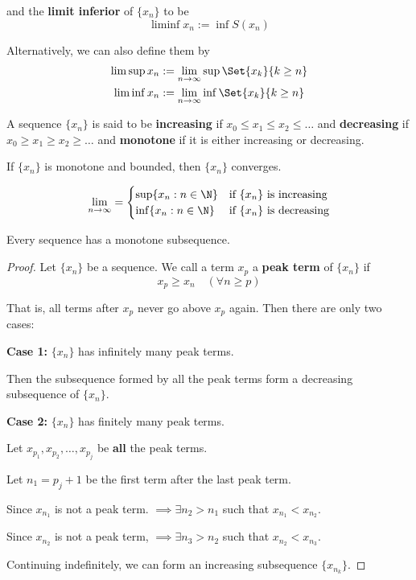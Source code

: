 and the \textbf{limit inferior} of $\{x_n\}$ to be
$$
	\liminf x_n := \inf S(x_n)
$$

Alternatively, we can also define them by
\begin{align*}
	\limsup x_n & := \lim_{n\to\infty}\sup\Set{x_k}{k\geq n} \\
	\liminf x_n & := \lim_{n\to\infty}\inf\Set{x_k}{k\geq n}
\end{align*}

\label{b5fad69}

A sequence $\{x_n\}$ is said to be \textbf{increasing} if $x_0\leq
	x_1\leq x_2\leq\ldots$ and \textbf{decreasing} if $x_0\geq x_1\geq
	x_2\geq\ldots$ and \textbf{monotone} if it is either increasing or
decreasing.

\label{ca25eb7}

If $\{x_n\}$ is monotone and bounded, then $\{x_n\}$ converges.

$$
	\lim_{n\to\infty}=\begin{cases}
		\sup\{x_n:n\in\N\} & \text{if $\{x_n\}$ is increasing} \\
		\inf\{x_n:n\in\N\} & \text{if $\{x_n\}$ is decreasing}
	\end{cases}
$$

\label{dddb70e}

Every sequence has a monotone subsequence.

\begin{proof}
	\def\xn{\{x_n\}}

	Let $\xn$ be a sequence. We call a term $x_p$ a \textbf{peak term}
	of $\xn$ if
	$$x_p\geq x_n\quad(\forall n\geq p)$$

	That is, all terms after $x_p$ never go above $x_p$ again. Then
	there are only two cases:

	\textbf{Case 1:} $\xn$ has infinitely many peak terms.

	Then the subsequence formed by all the peak terms form a decreasing
	subsequence of $\xn$.

	\textbf{Case 2:} $\xn$ has finitely many peak terms.

	Let $x_{p_1},x_{p_2},\ldots,x_{p_j}$ be \textbf{all} the peak terms.

	Let $n_1=p_j+1$ be the first term after the last peak term.

	Since $x_{n_1}$ is not a peak term. $\implies\exists n_2>n_1$ such
	that $x_{n_1}<x_{n_2}$.

	Since $x_{n_2}$ is not a peak term, $\implies\exists n_3>n_2$ such
	that $x_{n_2}<x_{n_3}$.

	Continuing indefinitely, we can form an increasing subsequence
	$\{x_{n_k}\}$.
\end{proof}

